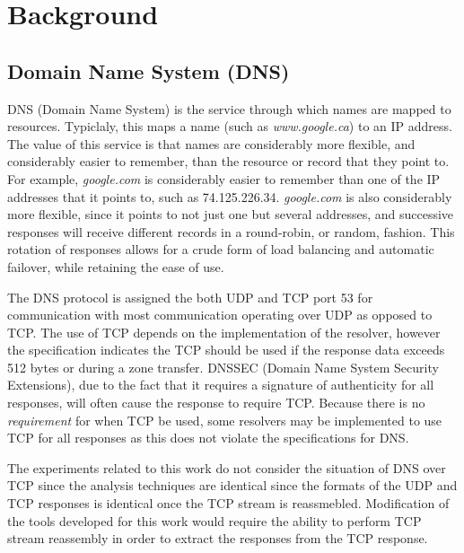 \documentclass{article}
\theoremstyle{remark}
\theoremstyle{definition}
\theoremstyle{definition}
\theoremstyle{definition}
\begin{document}
\section{Background}

\subsection{Domain Name System (DNS)}

DNS (Domain Name System) is the service through which names are mapped to
resources. Typiclaly, this maps a name (such as \emph{www.google.ca}) to an IP
address. The value of this service is that names are considerably more
flexible, and considerably easier to remember, than the resource or record that
they point to. For example, \emph{google.com} is considerably
easier to remember than one of the IP addresses that it points to, such as
74.125.226.34. \emph{google.com} is also considerably more flexible, since it
points to not just one but several addresses, and successive responses
will receive different records in a round-robin, or random, fashion. This
rotation of responses allows for a crude form of load balancing and automatic
failover, while retaining the ease of use.

The DNS protocol is assigned the both UDP and TCP port 53 for
communication with most communication operating over UDP as opposed to TCP. The
use of TCP depends on the implementation of the resolver, however the
specification indicates the TCP should be used if the response data exceeds 512
bytes or during a zone transfer\cite{ietf.rfc1035}. DNSSEC (Domain Name System
Security Extensions), due to the fact that it requires a signature of
authenticity for all responses, will often cause the response to
require TCP\cite{iana.rfc4034}. 
Because there is no \emph{requirement} for when
TCP be used, some resolvers may be implemented to use TCP for all responses as
this does not violate the specifications for DNS.

The experiments related to this work do not consider the situation of DNS over
TCP since the analysis techniques are identical since the formats of the UDP
and TCP responses is identical once the TCP stream is reassmebled. Modification
of the tools developed for this work would require the ability to perform TCP
stream reassembly in order to extract the responses from the TCP response.
\end{document}
